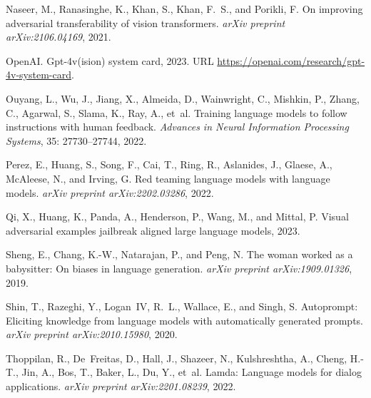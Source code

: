 \begin{thebibliography}{39}
Naseer, M., Ranasinghe, K., Khan, S., Khan, F.~S., and Porikli, F.
\newblock On improving adversarial transferability of vision transformers.
\newblock \emph{arXiv preprint arXiv:2106.04169}, 2021.

OpenAI.
\newblock Gpt-4v(ision) system card, 2023.
\newblock URL \url{https://openai.com/research/gpt-4v-system-card}.

Ouyang, L., Wu, J., Jiang, X., Almeida, D., Wainwright, C., Mishkin, P., Zhang, C., Agarwal, S., Slama, K., Ray, A., et~al.
\newblock Training language models to follow instructions with human feedback.
\newblock \emph{Advances in Neural Information Processing Systems}, 35: 27730--27744, 2022.

Perez, E., Huang, S., Song, F., Cai, T., Ring, R., Aslanides, J., Glaese, A., McAleese, N., and Irving, G.
\newblock Red teaming language models with language models.
\newblock \emph{arXiv preprint arXiv:2202.03286}, 2022.

Qi, X., Huang, K., Panda, A., Henderson, P., Wang, M., and Mittal, P.
\newblock Visual adversarial examples jailbreak aligned large language models, 2023.

Sheng, E., Chang, K.-W., Natarajan, P., and Peng, N.
\newblock The woman worked as a babysitter: On biases in language generation.
\newblock \emph{arXiv preprint arXiv:1909.01326}, 2019.

Shin, T., Razeghi, Y., Logan~IV, R.~L., Wallace, E., and Singh, S.
\newblock Autoprompt: Eliciting knowledge from language models with automatically generated prompts.
\newblock \emph{arXiv preprint arXiv:2010.15980}, 2020.

Thoppilan, R., De~Freitas, D., Hall, J., Shazeer, N., Kulshreshtha, A., Cheng, H.-T., Jin, A., Bos, T., Baker, L., Du, Y., et~al.
\newblock Lamda: Language models for dialog applications.
\newblock \emph{arXiv preprint arXiv:2201.08239}, 2022.


\end{thebibliography}
